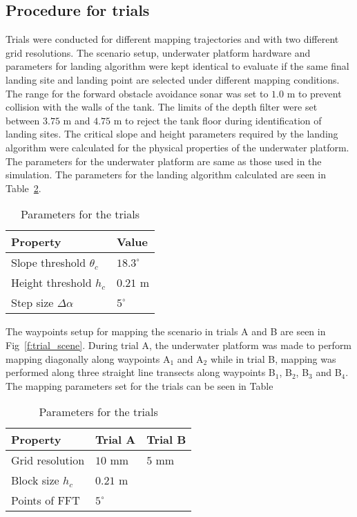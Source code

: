 
\subsection{Procedure for trials}
 
Trials were conducted for different mapping trajectories and with two different grid resolutions. The scenario setup, underwater platform hardware and parameters for landing algorithm were kept identical to evaluate if the same final landing site and landing point are selected under different mapping conditions. The range for the forward obstacle avoidance sonar was set to $1.0$ m to prevent collision with the walls of the tank. The limits of the depth filter were set between  $3.75$ m and $4.75$ m to reject the tank floor during identification of landing sites. The critical slope and height parameters required by the landing algorithm were calculated for the physical properties of the underwater platform. The parameters for the underwater platform are same as those used in the simulation. The parameters for the landing algorithm calculated are seen in Table~\ref{t:common_specs}. 

\begin{table}[!ht]
\centering
\caption{Parameters for the trials}
\begin{tabular}{ | p{5cm}  p{5cm} |}
\hline
\textbf{Property} & \textbf{Value}\\ \hline
Slope threshold $\theta_c$ & $18.3^\circ$\\
Height threshold $h_c$ & $0.21$ m \\
Step size $\Delta \alpha$ & $5^\circ$ \\
\hline
\end{tabular}
\label{t:common_specs}
\end{table}

The waypoints setup for mapping the scenario in trials A and B are seen in Fig~\ref{f:trial_scene}. During trial A, the underwater platform was made to perform mapping diagonally along waypoints A$_1$ and A$_2$ while in trial B, mapping was performed along three straight line transects along waypoints B$_1$, B$_2$, B$_3$ and B$_4$. The mapping parameters set for the trials can be seen in Table

\begin{table}[!ht]
\centering
\caption{Parameters for the trials}
\begin{tabular}{ | p{5cm}  p{5cm} p{5cm}|}
\hline
\textbf{Property} & \textbf{Trial A}  & \textbf{Trial B}\\ \hline
Grid resolution  & $10$ mm & $5$ mm \\
Block size $h_c$ & $0.21$ m & \\
Points of FFT  & $5^\circ$ & \\
\hline
\end{tabular}
\label{t:common_specs}
\end{table}

